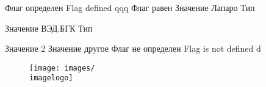 \ifIsLngRus  %
{
}
\fi
\ifIsLngEng  %
{
}
\fi




\ifdefined\typemanufacturer
\else
\newcommand{\typemanufacturer}{0}   %
\fi



\ifcase \typemanufacturer


\or 

\newcommand{\imagelogo}{image-not-found}
\newcommand{\productsertificate}{image-not-found}
\newcommand{\manufacturername}{ООО~«ХХХХХХХХХ»}
\newcommand{\address}{ХХХХХХХХХХХХХХХХ}
\newcommand{\phone}{ХХХХХХХХХХХХХХ}
\newcommand{\email}{ХХХХХХХХХХХХ}
\fi





\ifdefined\simulatorflag
Флаг определен Flag defined qqq
Флаг равен \simulatorflag
    \ifcase \simulatorflag
    Значение Лапаро Тип \typesimulator
    
    \or
    Значение ВЭД.БГК Тип \typesimulator
    
    \or
    Значение 2
    \else
    Значение другое
    \fi
\else
Флаг не определен Flag is not defined d

\fi




\begin{figure}[h]
    \texttt{[image: images/\\imagelogo]}
\end{figure}

        
